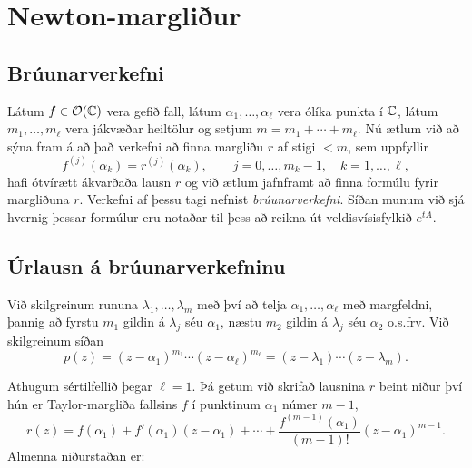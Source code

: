 \section{Newton-margliður}


\subsection*{Brúunarverkefni}

Látum $f\in {\cal O}({\mathbb C})$ vera gefið fall, látum $\alpha_1,\dots,\alpha_\ell$
vera ólíka punkta í ${\mathbb C}$, látum $m_1,\dots,m_\ell$ vera jákvæðar
heiltölur og setjum $m=m_1+\cdots+m_\ell$.  Nú ætlum við að sýna fram
á að það verkefni að finna margliðu $r$ af
stigi $<m$, sem uppfyllir
 \begin{equation*}f^{(j)}(\alpha_k) = r^{(j)}(\alpha_k), \qquad j=0,\dots,m_k-1, \quad
k=1,\dots, \ell,\label{10.13.1}
 \end{equation*}
hafi ótvírætt ákvarðaða lausn $r$ og við ætlum jafnframt að finna
formúlu fyrir margliðuna $r$.   Verkefni af þessu tagi nefnist
{\it brúunarverkefni}.
Síðan munum við sjá hvernig
þessar formúlur eru notaðar til þess að reikna út veldisvísisfylkið
$e^{tA}$.


\subsection*{Úrlausn á brúunarverkefninu}

Við skilgreinum rununa
$\lambda_1,\dots,\lambda_m$ með því að telja 
$\alpha_1,\dots,\alpha_\ell$ með margfeldni, þannig að fyrstu $m_1$
gildin á $\lambda_j$ séu $\alpha_1$, næstu $m_2$ gildin á $\lambda_j$
séu $\alpha_2$ o.s.frv.  Við skilgreinum síðan
 \begin{equation*}p(z)=(z-\alpha_1)^{m_1}\cdots(z-\alpha_\ell)^{m_\ell}
=(z-\lambda_1)\cdots(z-\lambda_m).\label{10.13.2}
 \end{equation*}

Athugum sértilfellið þegar $\ell=1$.  Þá getum við skrifað lausnina
$r$  beint niður því hún er Taylor-margliða
fallsins $f$ í punktinum $\alpha_1$ númer $m-1$,
$$
r(z)=f(\alpha_1)+f'(\alpha_1)(z-\alpha_1)+\cdots +
\frac {f^{(m-1)}(\alpha_1)}{(m-1)!}(z-\alpha_1)^{m-1}.
$$
Almenna niðurstaðan er:

